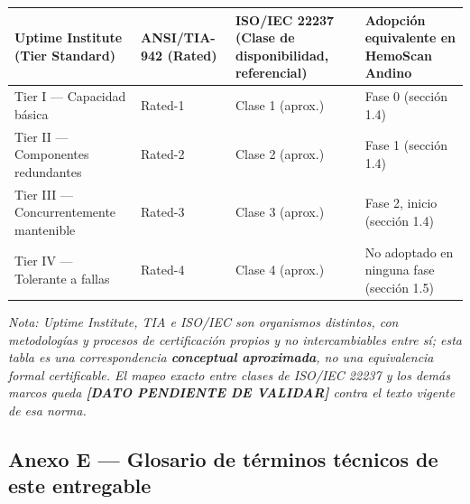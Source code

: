 \documentclass[11pt,a4paper]{article}
\begin{document}
{\small
\begin{longtable}[]{@{}
  >{\raggedright\arraybackslash}p{}
  >{\raggedright\arraybackslash}p{}
  >{\raggedright\arraybackslash}p{}
  >{\raggedright\arraybackslash}p{}@{}}
\toprule\noalign{}
\begin{minipage}[b]{\linewidth}\raggedright
Uptime Institute (Tier Standard)
\end{minipage} & \begin{minipage}[b]{\linewidth}\raggedright
ANSI/TIA-942 (Rated)
\end{minipage} & \begin{minipage}[b]{\linewidth}\raggedright
ISO/IEC 22237 (Clase de disponibilidad, referencial)
\end{minipage} & \begin{minipage}[b]{\linewidth}\raggedright
Adopción equivalente en HemoScan Andino
\end{minipage} \\
\midrule\noalign{}
\endhead
\bottomrule\noalign{}
\endlastfoot
Tier I --- Capacidad básica & Rated-1 & Clase 1 (aprox.) & Fase 0 (sección 1.4) \\
Tier II --- Componentes redundantes & Rated-2 & Clase 2 (aprox.) & Fase 1 (sección 1.4) \\
Tier III --- Concurrentemente mantenible & Rated-3 & Clase 3 (aprox.) & Fase 2, inicio (sección 1.4) \\
Tier IV --- Tolerante a fallas & Rated-4 & Clase 4 (aprox.) & No adoptado en ninguna fase (sección 1.5) \\
\end{longtable}
}

\emph{Nota: Uptime Institute, TIA e ISO/IEC son organismos distintos, con metodologías y procesos de certificación propios y no intercambiables entre sí; esta tabla es una correspondencia \textbf{conceptual aproximada}, no una equivalencia formal certificable. El mapeo exacto entre clases de ISO/IEC 22237 y los demás marcos queda \textbf{{[}DATO PENDIENTE DE VALIDAR{]}} contra el texto vigente de esa norma.}

\subsection{Anexo E --- Glosario de términos técnicos de este entregable}\label{anexo-e-glosario-de-tuxe9rminos-tuxe9cnicos-de-este-entregable}
\end{document}
